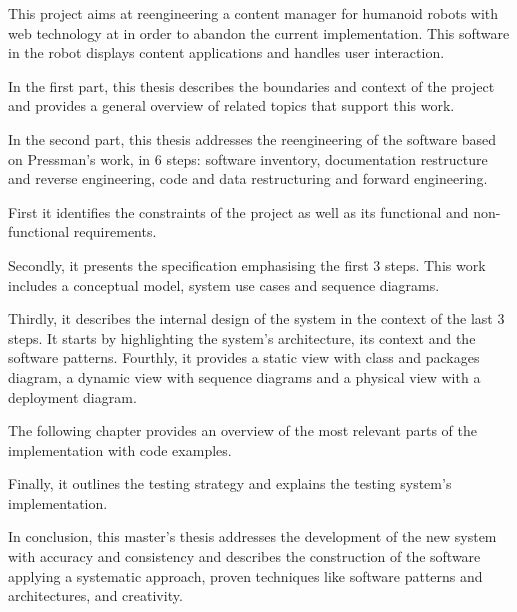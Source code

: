 % 
% 
%

This project aims at reengineering a content manager for humanoid robots with web technology at \company in order to abandon the current \flash implementation.
This software in the robot displays content applications and handles user interaction.

In the first part, this thesis describes the boundaries and context of the project and provides a general overview of related topics that support this work.

In the second part, this thesis addresses the reengineering of the software based on Pressman's work, in 6 steps: software inventory, documentation restructure and reverse engineering, code and data restructuring and forward engineering.

First it identifies the constraints of the project as well as its functional and non-functional requirements.

Secondly, it presents the specification emphasising the first 3 steps.
This work includes a conceptual model, system use cases and sequence diagrams.

Thirdly, it describes the internal design of the system in the context of the last 3 steps.
It starts by highlighting the system's architecture, its context and the software patterns.
Fourthly, it provides a static view with class and packages diagram, a dynamic view with sequence diagrams and a physical view with a deployment diagram.

The following chapter provides an overview of the most relevant parts of the implementation with code examples.

Finally, it outlines the testing strategy and explains the testing system's implementation.

In conclusion, this master's thesis addresses the development of the new system with accuracy and consistency and describes the construction of the software applying a systematic approach, proven techniques like software patterns and architectures, and creativity.


